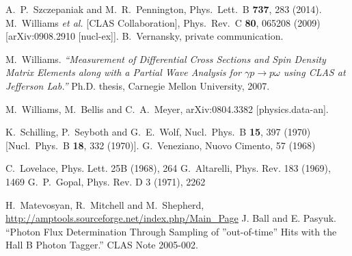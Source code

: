 \documentclass[a4paper,10pt]{report}
\begin{document}
\begin{thebibliography}{99}
  A.~P.~Szczepaniak and M.~R.~Pennington,
  Phys.\ Lett.\ B {\bf 737}, 283 (2014).
  M.~Williams {\it et al.} [CLAS Collaboration],
  Phys.\ Rev.\ C {\bf 80}, 065208 (2009)
  [arXiv:0908.2910 [nucl-ex]].
  B.~Vernansky, private communication.

M.~Williams. \textit{``Measurement of Differential Cross Sections and Spin Density Matrix Elements
along with a Partial Wave Analysis for $\gamma p \rightarrow p \omega$ using CLAS at Jefferson Lab.''} Ph.D.
thesis, Carnegie Mellon University, 2007.

  M.~Williams, M.~Bellis and C.~A.~Meyer,
  arXiv:0804.3382 [physics.data-an].



  K.~Schilling, P.~Seyboth and G.~E.~Wolf,
  Nucl.\ Phys.\ B {\bf 15}, 397 (1970)
  [Nucl.\ Phys.\ B {\bf 18}, 332 (1970)].
 G.~Veneziano, Nuovo Cimento, 57 (1968)

 C.~Lovelace, Phys. Lett. 25B (1968), 264
G.~Altarelli, Phys. Rev. 183 (1969), 1469
G.~P.~Gopal, Phys. Rev. D 3 (1971), 2262


H.~Matevosyan, R.~Mitchell and M.~Shepherd, \url{http://amptools.sourceforge.net/index.php/Main_Page}
 J. Ball and E. Pasyuk. ``Photon Flux Determination Through Sampling of ”out-of-time” Hits
with the Hall B Photon Tagger.'' CLAS Note 2005-002.

\end{thebibliography}


\newpage
\end{document}
